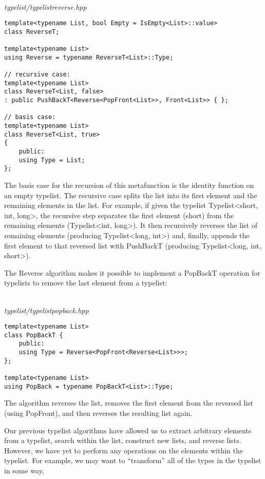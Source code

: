 \hspace*{\fill} \\ %
\noindent
\textit{typelist/typelistreverse.hpp}
\begin{lstlisting}[style=styleCXX]
template<typename List, bool Empty = IsEmpty<List>::value>
class ReverseT;

template<typename List>
using Reverse = typename ReverseT<List>::Type;

// recursive case:
template<typename List>
class ReverseT<List, false>
: public PushBackT<Reverse<PopFront<List>>, Front<List>> { };

// basis case:
template<typename List>
class ReverseT<List, true>
{
	public:
	using Type = List;
};
\end{lstlisting}

The basis case for the recursion of this metafunction is the identity function on an empty typelist. The recursive case splits the list into its first element and the remaining elements in the list. For example, if given the typelist Typelist<short, int, long>, the recursive step separates the first element (short) from the remaining elements (Typelist<int, long>). It then recursively reverses the list of remaining elements (producing Typelist<long, int>) and, finally, appends the first element to that reversed list with PushBackT (producing Typelist<long, int, short>).

The Reverse algorithm makes it possible to implement a PopBackT operation for typelists to remove the last element from a typelist:

\hspace*{\fill} \\ %
\noindent
\textit{typelist/typelistpopback.hpp}
\begin{lstlisting}[style=styleCXX]
template<typename List>
class PopBackT {
	public:
	using Type = Reverse<PopFront<Reverse<List>>>;
};

template<typename List>
using PopBack = typename PopBackT<List>::Type;
\end{lstlisting}

The algorithm reverses the list, removes the first element from the reversed list (using PopFront), and then reverses the resulting list again.


Our previous typelist algorithms have allowed us to extract arbitrary elements from a typelist, search within the list, construct new lists, and reverse lists. However, we have yet to perform any operations on the elements within the typelist. For example, we may want to “transform” all of the types in the typelist in some way, 

